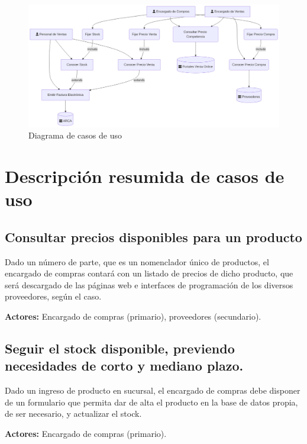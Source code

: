 \begin{figure}[ht]
	\vspace{20pt}
	\centering
	\vspace{15pt}
	\includegraphics[width=\textwidth]{img/01-diagrama-casos-uso}
	\caption{Diagrama de casos de uso}
	\vspace{15pt}
\end{figure}

\pagebreak

\section{Descripción resumida de casos de uso}

\subsection{Consultar precios disponibles para un producto}

Dado un número de parte,
que es un nomenclador único de productos,
el encargado de compras contará con un listado de precios de dicho producto,
que será descargado de las páginas web e interfaces de programación de los diversos proveedores,
según el caso.

\textbf{Actores:} Encargado de compras (primario), proveedores (secundario).

\subsection{Seguir el stock disponible, previendo necesidades de corto y mediano plazo.}

Dado un ingreso de producto en sucursal,
el encargado de compras debe disponer de un formulario que permita dar de alta el producto en la base de datos propia,
de ser necesario,
y actualizar el stock.

\textbf{Actores:} Encargado de compras (primario).

